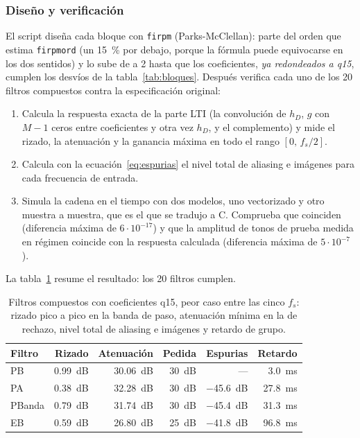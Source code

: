 \documentclass[11pt,a4paper]{article}
\begin{document}
\subsubsection{Diseño y verificación}

El script  diseña cada bloque con
\texttt{firpm} (Parks-McClellan): parte del orden que estima
\texttt{firpmord} (un \qty{15}{\percent} por debajo, porque la fórmula
puede equivocarse en los dos sentidos) y lo sube de a 2 hasta que los
coeficientes, \emph{ya redondeados a q15}, cumplen los desvíos de la
tabla~\ref{tab:bloques}. Después verifica cada uno de los 20 filtros
compuestos contra la especificación original:
\begin{enumerate}
  \item Calcula la respuesta exacta de la parte LTI (la convolución de
        $h_D$, $g$ con $M-1$ ceros entre coeficientes y otra vez $h_D$, y el
        complemento) y mide el rizado, la atenuación y la ganancia máxima en
        todo el rango $[0,\, f_s/2]$.
  \item Calcula con la ecuación~\eqref{eq:espurias} el nivel total de
        aliasing e imágenes para cada frecuencia de entrada.
  \item Simula la cadena en el tiempo con dos modelos, uno vectorizado y
        otro muestra a muestra, que es el que se tradujo a C. Comprueba que
        coinciden (diferencia máxima de $6 \cdot 10^{-17}$) y que la
        amplitud de tonos de prueba medida en régimen coincide con la
        respuesta calculada (diferencia máxima de $5 \cdot 10^{-7}$).
\end{enumerate}
La tabla~\ref{tab:compuestos} resume el resultado: los 20 filtros cumplen.

\begin{table}[H]
\centering
\caption{Filtros compuestos con coeficientes q15, peor caso entre las cinco
$f_s$: rizado pico a pico en la banda de paso, atenuación mínima en la de
rechazo, nivel total de aliasing e imágenes y retardo de grupo.}
\label{tab:compuestos}
\begin{tabular}{@{}l r r r r r@{}}
\toprule
\textbf{Filtro} & \textbf{Rizado} & \textbf{Atenuación} & \textbf{Pedida} &
\textbf{Espurias} & \textbf{Retardo}\\
\midrule
PB     & \qty{0.99}{\deci\bel} & \qty{30.06}{\deci\bel} & \qty{30}{\deci\bel}
       & ---                    & \qty{3.0}{\milli\second}\\
PA     & \qty{0.38}{\deci\bel} & \qty{32.28}{\deci\bel} & \qty{30}{\deci\bel}
       & \qty{-45.6}{\deci\bel} & \qty{27.8}{\milli\second}\\
PBanda & \qty{0.79}{\deci\bel} & \qty{31.74}{\deci\bel} & \qty{30}{\deci\bel}
       & \qty{-45.4}{\deci\bel} & \qty{31.3}{\milli\second}\\
EB     & \qty{0.59}{\deci\bel} & \qty{26.80}{\deci\bel} & \qty{25}{\deci\bel}
       & \qty{-41.8}{\deci\bel} & \qty{96.8}{\milli\second}\\
\bottomrule
\end{tabular}
\end{table}
\end{document}
